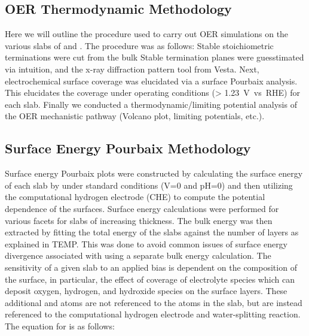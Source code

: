 \subsection{OER Thermodynamic Methodology}  %
%
%
Here we will outline the procedure used to carry out OER simulations on the various slabs of \IrOtwo and \IrOthree.
%
The procedure was as follows:
%
Stable stoichiometric terminations were cut from the bulk
%
Stable termination planes were guesstimated via intuition, and the x-ray diffraction pattern tool from Vesta.
%
Next, electrochemical surface coverage was elucidated via a surface Pourbaix analysis.
%
This elucidates the coverage under operating conditions (> \SI{1.23}{\volt vs. RHE}) for each slab.
%
Finally we conducted a thermodynamic/limiting potential analysis of the OER mechanistic pathway (Volcano plot, limiting potentials, etc.).


\subsection{Surface Energy Pourbaix Methodology}  %
%
%
Surface energy Pourbaix plots were constructed by calculating the surface energy of each slab by under standard conditions (\si{\volt}\num{=0} and pH\num{=0}) and then utilizing the computational hydrogen electrode (CHE) to compute the potential dependence of the surfaces.
%
Surface energy calculations were performed for various facets for slabs of increasing thickness.
%
The bulk energy was then extracted by fitting the total energy of the slabs against the number of layers as explained in TEMP.
%
This was  done to avoid common issues of surface energy divergence associated with using a separate bulk energy calculation.
%
The sensitivity of a given slab to an applied bias is dependent on the composition of the surface,
in particular, the effect of coverage of electrolyte species which can deposit oxygen, hydrogen, and hydroxide species on the surface layers.
%
These additional  and  atoms are not referenced to the atoms in the slab, but are instead referenced to the computational hydrogen electrode and water-splitting reaction.
%
The equation for is as follows:


